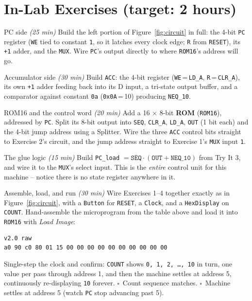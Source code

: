 \documentclass[11pt]{article}
\begin{document}
\section*{In-Lab Exercises (target: 2 hours)}

\begin{labexercise}{PC side \hfill {\small \itshape (25 min)}}
Build the left portion of Figure~\ref{fig:circuit} in full: the 4-bit \texttt{PC}
register (\texttt{WE} tied to constant \texttt{1}, so it latches every clock
edge; \texttt{R} from \texttt{RESET}), its \texttt{+1} adder, and the
\texttt{MUX}. Wire \texttt{PC}'s output directly to where \texttt{ROM16}'s
address will go.
\end{labexercise}

\begin{labexercise}{Accumulator side \hfill {\small \itshape (30 min)}}
Build \texttt{ACC}: the 4-bit register (\texttt{WE}\,=\,\texttt{LD\_A},
\texttt{R}\,=\,\texttt{CLR\_A}), its own \texttt{+1} adder feeding back into its
D input, a tri-state output buffer, and a comparator against constant
\texttt{0a} (\texttt{0x0A}\,=\,10) producing \texttt{NEQ\_10}.
\end{labexercise}

\begin{labexercise}{ROM16 and the control word \hfill {\small \itshape (20 min)}}
Add a 16 $\times$ 8-bit \textbf{ROM} (\texttt{ROM16}), addressed by \texttt{PC}.
Split its 8-bit output into \texttt{SEQ}, \texttt{CLR\_A}, \texttt{LD\_A},
\texttt{OUT} (1 bit each) and the 4-bit jump address using a Splitter. Wire the
three \texttt{ACC} control bits straight to Exercise 2's circuit, and the jump
address straight to Exercise 1's \texttt{MUX} input \texttt{1}.
\end{labexercise}

\begin{labexercise}{The glue logic \hfill {\small \itshape (15 min)}}
Build \texttt{PC\_load} $= \overline{\texttt{SEQ}} \cdot (\texttt{OUT} +
\texttt{NEQ\_10})$ from Try It 3, and wire it to the \texttt{MUX}'s select
input. This is the \emph{entire} control unit for this machine -- notice there is
no state register anywhere in it.
\end{labexercise}

\begin{labexercise}{Assemble, load, and run \hfill {\small \itshape (30 min)}}
Wire Exercises 1--4 together exactly as in Figure~\ref{fig:circuit}, with a
\texttt{Button} for \texttt{RESET}, a \texttt{Clock}, and a \texttt{HexDisplay}
on \texttt{COUNT}. Hand-assemble the microprogram from the table above and load
it into \texttt{ROM16} with \emph{Load Image}:
\begin{lstlisting}
v2.0 raw
a0 90 c0 80 01 15 00 00 00 00 00 00 00 00 00 00
\end{lstlisting}
Single-step the clock and confirm: \texttt{COUNT} shows \texttt{0, 1, 2,
\ldots, 10} in turn, one value per pass through address 1, and then the machine
settles at address 5, continuously re-displaying \texttt{10} forever.
$\square$~Count sequence matches. $\square$~Machine settles at address 5 (watch
\texttt{PC} stop advancing past 5).
\end{labexercise}
\end{document}
